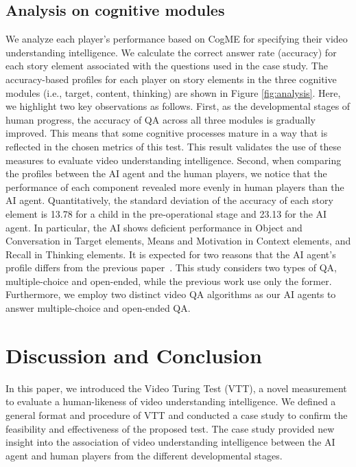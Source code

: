 \documentclass[letterpaper]{article} %
\begin{document}
\subsection{Analysis on cognitive modules}
We analyze each player's performance based on CogME for specifying their video understanding intelligence. We calculate the correct answer rate (accuracy) for each story element associated with the questions used in the case study. The accuracy-based profiles for each player on story elements in the three cognitive modules (i.e., target, content, thinking) are shown in Figure \ref{fig:analysis}. Here, we highlight two key observations as follows. First, as the developmental stages of human progress, the accuracy of QA across all three modules is gradually improved. This means that some cognitive processes mature in a way that is reflected in the chosen metrics of this test. This result validates the use of these measures to evaluate video understanding intelligence.
Second, when comparing the profiles between the AI agent and the human players, we notice that the performance of each component revealed more evenly in human players than the AI agent. Quantitatively, the standard deviation of the accuracy of each story element is 13.78 for a child in the pre-operational stage and 23.13 for the AI agent. In particular, the AI shows deficient performance in Object and Conversation in Target elements, Means and Motivation in Context elements, and Recall in Thinking elements. It is expected for two reasons that the AI agent's profile differs from the previous paper~\cite{shin2021cogme}. This study considers two types of QA, multiple-choice and open-ended, while the previous work use only the former. Furthermore, we employ two distinct video QA algorithms as our AI agents to answer multiple-choice and open-ended QA.


\section{Discussion and Conclusion}
In this paper, we introduced the Video Turing Test (VTT), a novel measurement to evaluate a human-likeness of video understanding intelligence. We defined a general format and procedure of VTT and conducted a case study to confirm the feasibility and effectiveness of the proposed test. The case study provided new insight into the association of video understanding intelligence between the AI agent and human players from the different developmental stages.
\end{document}
